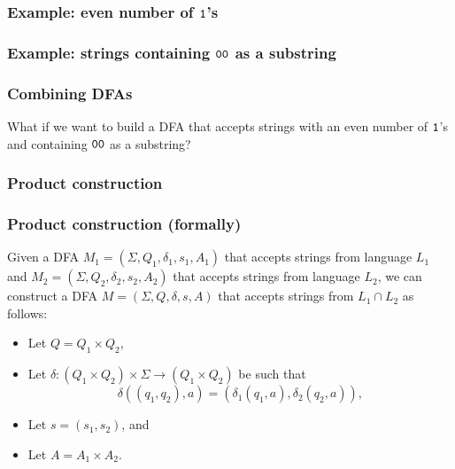 \begin{frame}
  \frametitle{Example: even number of ${\mathtt 1}$'s}
\end{frame}

\begin{frame}
  \frametitle{Example: strings containing ${\mathtt 0}{\mathtt 0}$ as a substring}
\end{frame}

\begin{frame}
  \frametitle{Combining DFAs}

  What if we want to build a DFA that accepts strings with an even
  number of ${\mathtt 1}$'s and containing ${\mathtt 0}{\mathtt 0}$ as a substring?

  \vspace{2in}
\end{frame}

\begin{frame}
  \frametitle{Product construction}
\end{frame}

\begin{frame}
  \frametitle{Product construction (formally)}

  Given a DFA $M_1=(\Sigma,Q_1,\delta_1,s_1,A_1)$ that accepts strings
  from language $L_1$ and $M_2=(\Sigma,Q_2,\delta_2,s_2,A_2)$ that
  accepts strings from language $L_2$, we can construct a DFA
  $M=(\Sigma,Q,\delta,s,A)$ that accepts strings from $L_1\cap L_2$ as
  follows:

  \begin{itemize}
  \item Let $Q=Q_1\times Q_2$, \pause
  \item Let $\delta: (Q_1\times Q_2)\times \Sigma \longrightarrow (Q_1\times Q_2)$ be such that \pause
    \[
    \delta((q_1,q_2),a) = (\delta_1(q_1,a), \delta_2(q_2,a)),
    \]
    \pause
  \item Let $s=(s_1,s_2)$, and \pause
  \item Let $A=A_1\times A_2$.
  \end{itemize}
  
\end{frame}

